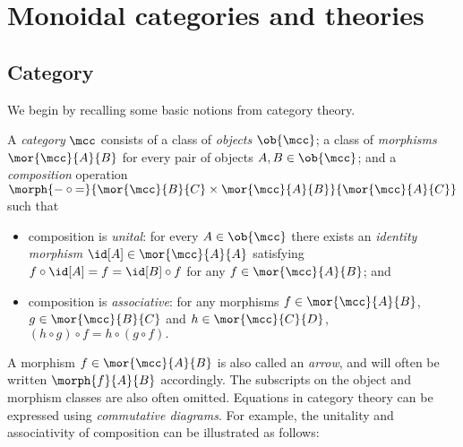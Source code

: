 \chapter{Monoidal categories and theories}

\section{Category}

We begin by recalling some basic notions from category theory.

\begin{definition}[Category]
    A \emph{category} \(\mcc\) consists of a class of \emph{objects}
    \(\ob{\mcc}\); a class of \emph{morphisms} \(\mor{\mcc}{A}{B}\)
    for every pair of objects \(A, B \in \ob{\mcc}\); and a \emph{composition}
    operation \(
        \morph{
            {-} \circ {=}
        }{
            \mor{\mcc}{B}{C} \times \mor{\mcc}{A}{B}
        }{
            \mor{\mcc}{A}{C}
        }
    \) such that
    \begin{itemize}
        \item composition is \emph{unital}: for every \(
                    A \in \ob{\mcc}
                \) there exists an \emph{identity morphism} \(
                    \id[A] \in \mor{\mcc}{A}{A}
                \) satisfying \(
                    f \circ \id[A] = f = \id[B] \circ f
                \) for any \(
                    f \in \mor{\mcc}{A}{B}
                \); and
        \item composition is \emph{associative}: for any morphisms \(
                    f \in \mor{\mcc}{A}{B}
                \), \(
                    g \in \mor{\mcc}{B}{C}
                \) and \(h \in \mor{\mcc}{C}{D}\), \(
                    (h \circ g) \circ f = h \circ (g \circ f).
                \)
    \end{itemize}
\end{definition}

A morphism \(f \in \mor{\mcc}{A}{B}\) is also called an \emph{arrow}, and will
often be written \(\morph{f}{A}{B}\) accordingly.
The subscripts on the object and morphism classes are also often omitted.
Equations in category theory can be expressed using \emph{commutative diagrams}.
For example, the unitality and associativity of composition can be illustrated
as follows:

\begin{center}
    
    \quad
    
\end{center}

